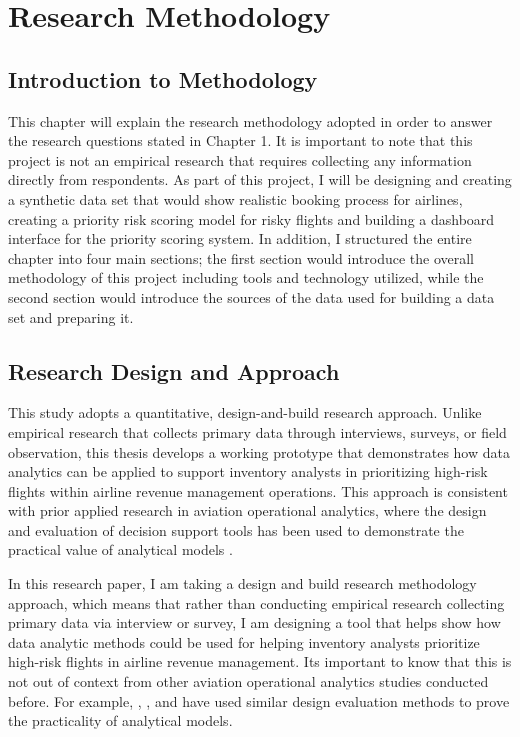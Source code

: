 \chapter{Research Methodology}
\label{ch:methodology}

\section{Introduction to Methodology}

This chapter will explain the research methodology adopted in order to answer the research questions stated in Chapter 1. It is important to note that this project is not an empirical research that requires collecting any information directly from respondents. As part of this project, I will be designing and creating a synthetic data set that would show realistic booking process for airlines, creating a priority risk scoring model for risky flights and building a dashboard interface for the priority scoring system. In addition, I structured the entire chapter into four main sections; the first section would introduce the overall methodology of this project including tools and technology utilized, while the second section would introduce the sources of the data used for building a data set and preparing it.

\section{Research Design and Approach}

This study adopts a quantitative, design-and-build research approach. Unlike empirical research that collects primary data through interviews, surveys, or field observation, this thesis develops a working prototype that demonstrates how data analytics can be applied to support inventory analysts in prioritizing high-risk flights within airline revenue management operations. This approach is consistent with prior applied research in aviation operational analytics, where the design and evaluation of decision support tools has been used to demonstrate the practical value of analytical models \citep{Rakshit1996, Salleh2023, Watson2006}.

In this research paper, I am taking a design and build research methodology approach, which means that rather than conducting empirical research collecting primary data via interview or survey, I am designing a tool that helps show how data analytic methods could be used for helping inventory analysts prioritize high-risk flights in airline revenue management. Its important to know that this is not out of context from other aviation operational analytics studies conducted before. For example, \citet{Rakshit1996}, \citet{Salleh2023}, and \citet{Watson2006} have used similar design evaluation methods to prove the practicality of analytical models.

